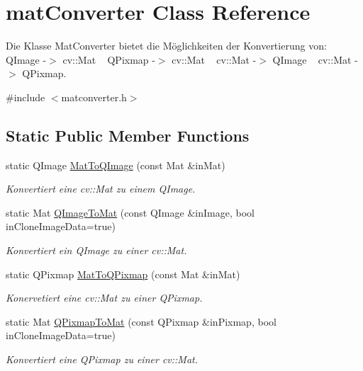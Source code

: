 \hypertarget{classmat_converter}{}\section{mat\+Converter Class Reference}
\label{classmat_converter}


Die Klasse Mat\+Converter bietet die Möglichkeiten der Konvertierung von\+: ~\newline
Q\+Image -\/$>$ cv\+::\+Mat ~\newline
Q\+Pixmap -\/$>$ cv\+::\+Mat ~\newline
cv\+::\+Mat -\/$>$ Q\+Image ~\newline
cv\+::\+Mat -\/$>$ Q\+Pixmap.  




{\ttfamily \#include $<$matconverter.\+h$>$}

\subsection*{Static Public Member Functions}
\begin{DoxyCompactItemize}
\item 
static Q\+Image \hyperlink{classmat_converter_a7acedb3a24697000981663c4e12ff368}{Mat\+To\+Q\+Image} (const Mat \&in\+Mat)
\begin{DoxyCompactList}\small\item\em Konvertiert eine cv\+::\+Mat zu einem Q\+Image. \end{DoxyCompactList}\item 
static Mat \hyperlink{classmat_converter_ab98d09f930e94a6466334fb005f94d75}{Q\+Image\+To\+Mat} (const Q\+Image \&in\+Image, bool in\+Clone\+Image\+Data=true)
\begin{DoxyCompactList}\small\item\em Konvertiert ein Q\+Image zu einer cv\+::\+Mat. \end{DoxyCompactList}\item 
static Q\+Pixmap \hyperlink{classmat_converter_a46a5639a0a16c71396d27325822d19c9}{Mat\+To\+Q\+Pixmap} (const Mat \&in\+Mat)
\begin{DoxyCompactList}\small\item\em Konervetiert eine cv\+::\+Mat zu einer Q\+Pixmap. \end{DoxyCompactList}\item 
static Mat \hyperlink{classmat_converter_a93e498ab547fca1459aa20e5a2730fda}{Q\+Pixmap\+To\+Mat} (const Q\+Pixmap \&in\+Pixmap, bool in\+Clone\+Image\+Data=true)
\begin{DoxyCompactList}\small\item\em Konvertiert eine Q\+Pixmap zu einer cv\+::\+Mat. \end{DoxyCompactList}\end{DoxyCompactItemize}


